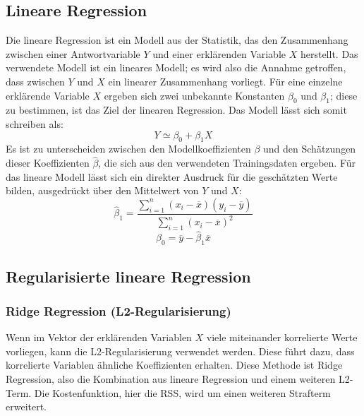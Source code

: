 \subsection{Lineare Regression}
Die lineare Regression ist ein Modell aus der Statistik, das den Zusammenhang zwischen einer Antwortvariable \(Y\) und einer erklärenden Variable \(X\) herstellt. Das verwendete Modell ist ein lineares Modell; es wird also die Annahme getroffen, dass zwischen \(Y\) und \(X\) ein linearer Zusammenhang vorliegt. Für eine einzelne erklärende Variable \(X\) ergeben sich zwei unbekannte Konstanten \(\beta_0\) und \(\beta_1\); diese zu bestimmen, ist das Ziel der linearen Regression. Das Modell lässt sich somit schreiben als:
\begin{equation}
    Y \simeq \beta_0 + \beta_1 X
    \label{eq:linreg1}
\end{equation}
Es ist zu unterscheiden zwischen den Modellkoeffizienten \(\beta\) und den Schätzungen dieser Koeffizienten \(\hat{\beta}\), die sich aus den verwendeten Trainingsdaten ergeben. 
Für das lineare Modell lässt sich ein direkter Ausdruck für die geschätzten Werte bilden, ausgedrückt über den Mittelwert von \(Y\) und \(X\):
\begin{equation}
    \hat{\beta}_1 = \frac{\sum_{i=1}^{n}(x_i - \overline{x})(y_i - \overline{y})}{\sum_{i=1}^{n}(x_i - \overline{x})^2}
\end{equation}
\begin{equation}
\hat{\beta}_0 = \overline{y} - \hat{\beta}_1\overline{x}
\end{equation}

\cite{james2013}

\subsection{Regularisierte lineare Regression}

\subsubsection{Ridge Regression (L2-Regularisierung)}
Wenn im Vektor der erklärenden Variablen \(X\) viele miteinander korrelierte Werte vorliegen, kann die L2-Regularisierung verwendet werden. Diese führt dazu, dass korrelierte Variablen ähnliche Koeffizienten erhalten. Diese Methode ist Ridge Regression, also die Kombination aus lineare Regression und einem weiteren L2-Term. Die Kostenfunktion, hier die RSS, wird um einen weiteren Strafterm erweitert.

